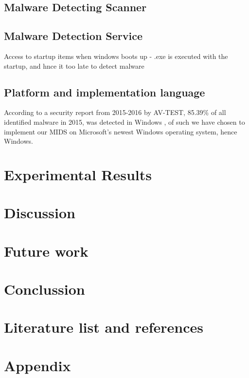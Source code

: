 \documentclass[12pt]{article} %
\begin{document}
\subsection{Malware Detecting Scanner}


\subsection{Malware Detection Service}
Access to startup items when windows boots up - .exe is executed with the startup, and hnce it too late to detect malware

\subsection{Platform and implementation language}
According to a security report from 2015-2016 by AV-TEST, 85.39\% of all identified malware in 2015, was detected in Windows\® \cite{avtestreport }, of such we have chosen to implement our MIDS on Microsoft’s newest Windows \® operating system, hence Windows.  

\section{Experimental Results}

\section{Discussion}

\section{Future work}

\section{Conclussion}
\section{Literature list and references}
\section{Appendix}




\newpage
\appendix
\label{appendix}
\end{document}
